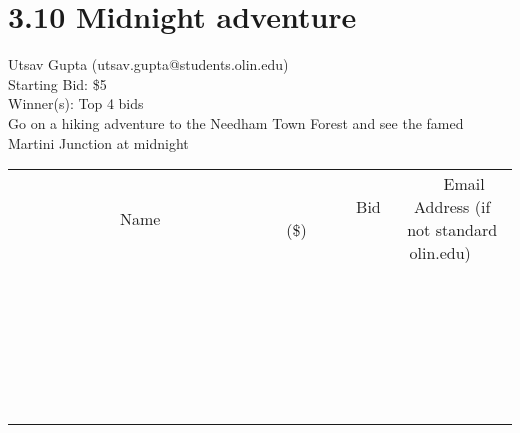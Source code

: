 \documentclass[11pt]{article}
\begin{document}
\section*{3.10 Midnight adventure}
Utsav Gupta (utsav.gupta@students.olin.edu) \\
Starting Bid: \$5 \\
Winner(s): 
Top 4 bids \\
Go on a hiking adventure to the Needham Town Forest and see the famed Martini Junction at midnight \\[6ex]
\begin{tabular}{c c c}
~~~~~~~~~~~~~Name~~~~~~~~~~~~~ & ~~~~~~~~~Bid (\$)~~~~~~~~~ & ~~~Email Address (if not standard olin.edu)~~~ \\
 & & \\
\hline
 & & \\
\hline
 & & \\
\hline
 & & \\
\hline
 & & \\
\hline
 & & \\
\hline
 & & \\
\hline
 & & \\
\hline
 & & \\
\hline
 & & \\
\hline
 & & \\
\hline
 & & \\
\hline
 & & \\
\hline
 & & \\
\hline
 & & \\
\hline
 & & \\
\hline
 & & \\
\hline
 & & \\
\hline
 & & \\
\hline
 & & \\
\hline
 & & \\
\hline
 & & \\
\hline
 & & \\
\hline
 & & \\
\hline
 & & \\
\hline
 & & \\
\hline
\end{tabular}
\clearpage
\end{document}
